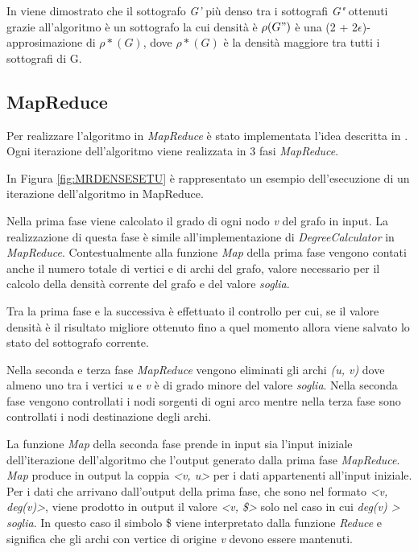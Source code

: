 \documentclass[LaM,binding=0.6cm]{sapthesis}
\begin{document}
In \cite{Bahmani:2012:DSS:2140436.2140442} viene dimostrato che il sottografo \textit{G'} più denso tra i sottografi \textit{G"} ottenuti grazie all'algoritmo è un sottografo la cui densità è $\rho(G")$ è una  (2 + 2$\epsilon$)-approsimazione di $\rho*(G)$, dove $\rho*(G)$ è la densità maggiore tra tutti i sottografi di G.

\begin{minipage}{\linewidth}

\end{minipage}

\subsection{MapReduce} 

Per realizzare l'algoritmo in \textit{MapReduce} è stato implementata l'idea descritta in \cite{Bahmani:2012:DSS:2140436.2140442}. Ogni iterazione dell'algoritmo viene realizzata in 3 fasi \textit{MapReduce}.


In Figura \ref{fig:MRDENSESETU} è rappresentato un esempio dell'esecuzione di un iterazione dell'algoritmo in MapReduce.

Nella prima fase viene calcolato il grado di ogni nodo \textit{v} del grafo in input. La realizzazione di questa fase è simile all'implementazione di \textit{DegreeCalculator} in \textit{MapReduce}. Contestualmente alla funzione \textit{Map} della prima fase vengono contati anche il numero totale di vertici e di archi del grafo, valore necessario per il calcolo della densità corrente del grafo e del valore \textit{soglia}. 

Tra la prima fase e la successiva è effettuato il controllo  per cui, se il valore densità è il risultato migliore ottenuto fino a quel momento allora viene salvato lo stato del sottografo corrente.

Nella seconda e terza fase \textit{MapReduce} vengono eliminati gli archi \textit{(u, v)} dove almeno uno tra i vertici \textit{u} e \textit{v} è di grado minore del valore \textit{soglia}. 
Nella seconda fase vengono controllati i nodi sorgenti di ogni arco mentre nella terza fase sono controllati i nodi destinazione degli archi.

La funzione \textit{Map} della seconda fase prende in input sia l'input iniziale dell'iterazione dell'algoritmo che l'output generato dalla prima fase \textit{MapReduce}.
\textit{Map} produce in output la coppia \textit{<v, u>} per i dati appartenenti all'input iniziale. Per i dati che arrivano dall'output della prima fase, che sono nel formato \textit{<v, deg(v)>}, viene prodotto in output il valore \textit{<v, \$>} solo nel caso in cui \textit{deg(v) > soglia}. In questo caso il simbolo \$ viene interpretato dalla funzione \textit{Reduce} e significa che gli archi con vertice di origine \textit{v} devono essere mantenuti.
\end{document}
